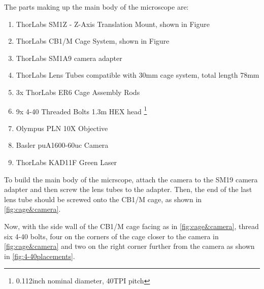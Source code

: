 \documentclass[runningheads]{llncs}
\begin{document}
The parts making up the main body of the microscope are:
\begin{enumerate}
    \item ThorLabs SM1Z - Z-Axis Translation Mount, shown in Figure 
    \item ThorLabs CB1/M Cage System, shown in Figure
    \item ThorLabs SM1A9 camera adapter
    \item ThorLabs Lens Tubes compatible with 30mm cage system, total length 78mm
    \item 3x ThorLabs ER6 Cage Assembly Rods
    \item 9x 4-40 Threaded Bolts 1.3m HEX head \footnote{0.112inch nominal diameter, 40TPI pitch}
    \item Olympus PLN 10X Objective
    \item Basler puA1600-60uc Camera
    \item ThorLabs KAD11F Green Laser 
\end{enumerate}

To build the main body of the micrscope, attach the camera to the SM19 camera adapter and then screw the lens tubes to the adapter. Then, the end of the last lens tube should be screwed onto the CB1/M cage, as shown in \ref{fig:cage&camera}. 
        
Now, with the side wall of the CB1/M cage facing as in \ref{fig:cage&camera}, thread six 4-40 bolts, four on the corners of the cage closer to the camera in \ref{fig:cage&camera} and two on the right corner further from the camera as shown in \ref{fig:4-40placements}. 
\end{document}
